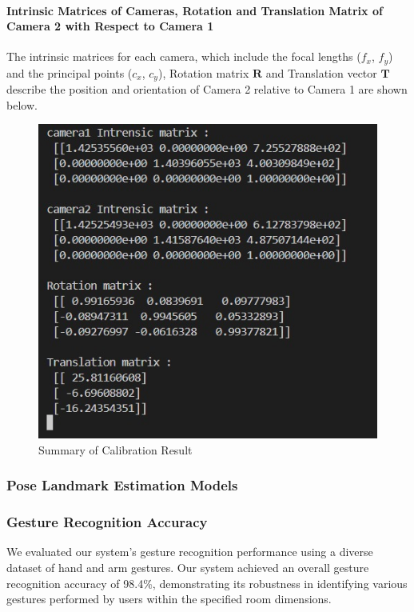 \paragraph{Intrinsic Matrices of Cameras, Rotation and Translation Matrix of Camera 2 with Respect to Camera 1}
The intrinsic matrices for each camera, which include the focal lengths (\(f_x\), \(f_y\)) and the principal points (\(c_x\), \(c_y\)), Rotation matrix \(\mathbf{R}\) and Translation vector \(\mathbf{T}\) describe the position and orientation of Camera 2 relative to Camera 1 are shown below.


\begin{figure}[h!]
	\centering
	\includegraphics[height=0.4\textheight]{images/calibratiion_result.jpeg}
	\caption{Summary of Calibration Result}
\end{figure}




\subsubsection{Pose Landmark Estimation Models}


\subsubsection{Gesture Recognition Accuracy}
We evaluated our system's gesture recognition performance using a diverse dataset of hand and arm gestures. Our system achieved an overall gesture recognition accuracy of 98.4\%, demonstrating its robustness in identifying various gestures performed by users within the specified room dimensions.

